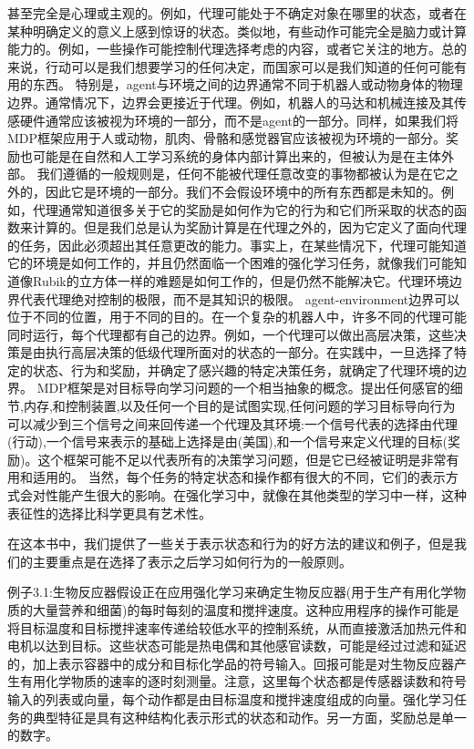 甚至完全是心理或主观的。例如，代理可能处于不确定对象在哪里的状态，或者在某种明确定义的意义上感到惊讶的状态。类似地，有些动作可能完全是脑力或计算能力的。例如，一些操作可能控制代理选择考虑的内容，或者它关注的地方。总的来说，行动可以是我们想要学习的任何决定，而国家可以是我们知道的任何可能有用的东西。
特别是，agent与环境之间的边界通常不同于机器人或动物身体的物理边界。通常情况下，边界会更接近于代理。例如，机器人的马达和机械连接及其传感硬件通常应该被视为环境的一部分，而不是agent的一部分。同样，如果我们将MDP框架应用于人或动物，肌肉、骨骼和感觉器官应该被视为环境的一部分。奖励也可能是在自然和人工学习系统的身体内部计算出来的，但被认为是在主体外部。
我们遵循的一般规则是，任何不能被代理任意改变的事物都被认为是在它之外的，因此它是环境的一部分。我们不会假设环境中的所有东西都是未知的。例如，代理通常知道很多关于它的奖励是如何作为它的行为和它们所采取的状态的函数来计算的。但是我们总是认为奖励计算是在代理之外的，因为它定义了面向代理的任务，因此必须超出其任意更改的能力。事实上，在某些情况下，代理可能知道它的环境是如何工作的，并且仍然面临一个困难的强化学习任务，就像我们可能知道像Rubik的立方体一样的难题是如何工作的，但是仍然不能解决它。代理环境边界代表代理绝对控制的极限，而不是其知识的极限。
agent-environment边界可以位于不同的位置，用于不同的目的。在一个复杂的机器人中，许多不同的代理可能同时运行，每个代理都有自己的边界。例如，一个代理可以做出高层决策，这些决策是由执行高层决策的低级代理所面对的状态的一部分。在实践中，一旦选择了特定的状态、行为和奖励，并确定了感兴趣的特定决策任务，就确定了代理环境的边界。
MDP框架是对目标导向学习问题的一个相当抽象的概念。提出任何感官的细节,内存,和控制装置,以及任何一个目的是试图实现,任何问题的学习目标导向行为可以减少到三个信号之间来回传递一个代理及其环境:一个信号代表的选择由代理(行动),一个信号来表示的基础上选择是由(美国),和一个信号来定义代理的目标(奖励)。这个框架可能不足以代表所有的决策学习问题，但是它已经被证明是非常有用和适用的。
当然，每个任务的特定状态和操作都有很大的不同，它们的表示方式会对性能产生很大的影响。在强化学习中，就像在其他类型的学习中一样，这种表征性的选择比科学更具有艺术性。

在这本书中，我们提供了一些关于表示状态和行为的好方法的建议和例子，但是我们的主要重点是在选择了表示之后学习如何行为的一般原则。

例子3.1:生物反应器假设正在应用强化学习来确定生物反应器(用于生产有用化学物质的大量营养和细菌)的每时每刻的温度和搅拌速度。这种应用程序的操作可能是将目标温度和目标搅拌速率传递给较低水平的控制系统，从而直接激活加热元件和电机以达到目标。这些状态可能是热电偶和其他感官读数，可能是经过过滤和延迟的，加上表示容器中的成分和目标化学品的符号输入。回报可能是对生物反应器产生有用化学物质的速率的逐时刻测量。注意，这里每个状态都是传感器读数和符号输入的列表或向量，每个动作都是由目标温度和搅拌速度组成的向量。强化学习任务的典型特征是具有这种结构化表示形式的状态和动作。另一方面，奖励总是单一的数字。

